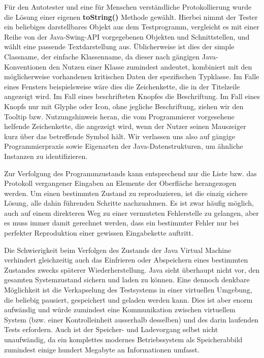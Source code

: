 Für den Autotester und eine für Menschen verständliche Protokollierung
wurde die Lösung einer eigenen \textbf{toString()} Methode gewählt.
Hierbei nimmt der Tester ein beliebiges darstellbares Objekt aus dem Testprogramm,
vergleicht es mit einer Reihe von der Java-Swing-API vorgegebenen
Objekten und Schnittstellen, und wählt eine passende Textdarstellung aus.
Üblicherweise ist dies der \glqq{}simple Classname\grqq{}, der einfache Klassenname,
da dieser nach gängigen Java-Konventionen den Nutzen einer Klasse zumindest
andeutet, kombiniert mit den möglicherweise vorhandenen kritischen Daten
der spezifischen Typklasse. Im Falle eines Fensters beispielsweise wäre
dies die Zeichenkette, die in der Titelzeile angezeigt wird. Im Fall
eines beschrifteten Knopfes die Beschriftung. Im Fall eines Knopfs
nur mit Glyphe oder Icon, ohne jegliche Beschriftung, 
ziehen wir den \glqq{}Tooltip\grqq{} bzw. Nutzungshinweis heran,
die vom Programmierer vorgesehene helfende Zeichenkette, die angezeigt
wird, wenn der Nutzer seinen Mauszeiger kurz über das betreffende Symbol hält.
Wir verlassen uns also auf gängige Programmierpraxis sowie Eigenarten der 
Java-Datenstrukturen, um ähnliche Instanzen zu identifizieren.

Zur Verfolgung des Programmzustands kann entsprechend nur die Liste
bzw. das Protokoll vergangener Eingaben an Elemente der Oberfläche
herangezogen werden. Um einen bestimmten Zustand zu reproduzieren,
ist die einzig sichere Lösung, alle dahin führenden Schritte nachzuahmen.
Es ist zwar häufig möglich, auch auf einem direkteren Weg zu einer
vermuteten Fehlerstelle zu gelangen, aber es muss immer damit gerechnet
werden, dass ein bestimmter Fehler nur bei perfekter Reproduktion
einer gewissen Eingabekette auftritt. 

Die Schwierigkeit beim
Verfolgen des Zustands der Java Virtual Machine verhindert
gleichzeitig auch das Einfrieren oder Abspeichern eines bestimmten Zustandes
zwecks späterer Wiederherstellung. Java sieht überhaupt nicht vor,
den gesamten Systemzustand sichern und laden zu können. Eine dennoch
denkbare Möglichkeit ist die Verkapselung des Testsystems in einer
virtuellen Umgebung, die beliebig pausiert, gespeichert und geladen
werden kann. Dies ist aber enorm aufwändig und würde zumindest eine
Kommunikation zwischen virtuellem System (bzw. einer Kontrolleinheit
ausserhalb desselben) und des darin laufenden Tests erfordern.
Auch ist der Speicher- und Ladevorgang selbst nicht unaufwändig,
da ein komplettes modernes Betriebssystem als Speicherabbild zumindest einige hundert
Megabyte an Informationen umfasst.

